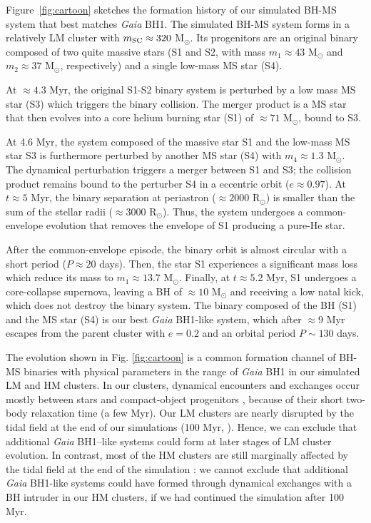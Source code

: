 \documentclass[fleqn,usenatbib]{mnras}
\newcommand{\Ms}{M$_\odot$}
\newcommand{\bh}{\textit{Gaia} BH1}
\begin{document}
Figure~\ref{fig:cartoon} sketches the formation history of our  
simulated 
BH-MS system 
that best matches \bh{}. 
The simulated BH-MS system forms in a relatively LM cluster with $m_{\rm{SC}}\approx 320$ \Ms.
Its progenitors are an original binary composed of two quite massive stars (S1 and S2, with mass $m_{1} \approx 43$ \Ms{} and $m_{2} \approx 37$ \Ms{}, respectively) and a single low-mass MS star (S4).


At $\approx{4.3}$ Myr, the original S1-S2 binary system is perturbed by a low mass MS star (S3) which triggers the binary collision. The merger product is a MS star that  
then evolves into a core helium burning star (S1) of $\approx 71$ \Ms{}, bound to S3. 

At 4.6 Myr, the system composed of the massive star S1 and the low-mass MS star S3 is furthermore perturbed by another MS star (S4) with $m_{4} \approx 1.3$ \Ms{}. 
The dynamical perturbation 
triggers a merger between S1 and S3; the collision product remains bound to the perturber S4 in a eccentric orbit ($e\approx0.97$). 
At $t\approx5$ Myr, the binary separation at periastron ($\approx 2000 $ R$_{\odot}$) is smaller than the sum of the stellar radii ($\approx 3000 $ R$_{\odot}$). Thus, the system undergoes a common-envelope evolution that removes the envelope of S1 producing a pure-He star.



After the common-envelope episode, the binary orbit is almost circular with a short period ($P \approx 20 $ days). Then, the star S1 experiences a significant mass loss  which reduce its mass to $m_{1} \approx 13.7$ \Ms. Finally, at $t\approx5.2$ Myr, S1 undergoes a core-collapse supernova, leaving a BH of $\approx 10$ \Ms{} and receiving a low natal kick, which does not destroy the binary system.
The binary composed of the BH (S1) and the MS star (S4) is our best \bh{}-like system, which after $\approx{9}$ Myr escapes from the parent cluster with $e=0.2$ and an orbital period $P\sim 130$ days.

The evolution shown in Fig. \ref{fig:cartoon} is 
a common formation channel of BH-MS binaries with physical parameters in the range of \bh{} in our simulated LM and HM clusters. In our clusters, dynamical encounters and exchanges occur mostly between stars and compact-object progenitors \citep{dicarlo20,Rastello20,rastello2021,torniamenti2022}, because of their short two-body relaxation time (a few Myr). 
Our LM clusters are nearly disrupted by the tidal field at the end of our simulations (100 Myr, \citealt{torniamenti2022}). Hence, we can exclude that additional \bh--like systems could form at later stages of LM cluster evolution.
In contrast, most of the HM clusters are still marginally  affected by the tidal field at the end of the simulation \citep{dicarlo20}: we cannot exclude that additional \bh{}-like systems could have formed through 
dynamical exchanges with a BH intruder in our HM clusters, if we 
had continued the simulation after 100 Myr. 
\end{document}
